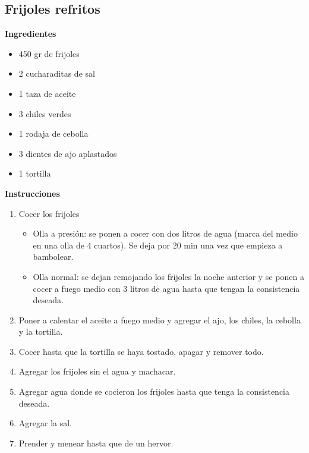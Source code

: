 \subsection{Frijoles refritos}
\label{sec:frijoles-refritos}

\textbf{Ingredientes}
\begin{itemize}
\item 450 gr de frijoles
\item 2 cucharaditas de sal
\item 1 taza de aceite
\item 3 chiles verdes
\item 1 rodaja de cebolla
\item 3 dientes de ajo aplastados
\item 1 tortilla
\end{itemize}

\textbf{Instrucciones}
\begin{enumerate}
\item Cocer los frijoles
\begin{itemize}
\item Olla a presión: se ponen a cocer con dos litros de agua (marca del medio en una olla de 4 cuartos). Se deja por 20 min una vez que empieza a bambolear. 
\item Olla normal: se dejan remojando los frijoles la noche anterior y se ponen a cocer a fuego medio con 3 litros de agua hasta que tengan la consistencia deseada.
\end{itemize}
\item Poner a calentar el aceite a fuego medio y agregar el ajo, los chiles, la cebolla y la tortilla. 
\item Cocer hasta que la tortilla se haya tostado, apagar y remover todo.
\item Agregar los frijoles sin el agua y machacar.
\item Agregar agua donde se cocieron los frijoles hasta que tenga la consistencia deseada.
\item Agregar la sal.
\item Prender y menear hasta que de un hervor.
\end{enumerate}
